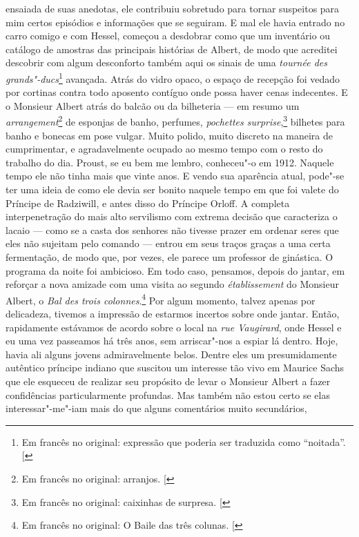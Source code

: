 ensaiada de suas anedotas, ele contribuiu sobretudo para tornar
suspeitos para mim certos episódios e informações que se seguiram. E mal
ele havia entrado no carro comigo e com Hessel, começou a desdobrar como
que um inventário ou catálogo de amostras das principais histórias de
Albert, de modo que acreditei descobrir com algum desconforto também
aqui os sinais de uma \emph{tournée des grands"-ducs}\footnote{Em francês no original: expressão que poderia ser traduzida como ``noitada''. {[}\versal{N.~T.}{]}} avançada. Atrás do
vidro opaco, o espaço de recepção foi vedado por cortinas contra todo
aposento contíguo onde possa haver cenas indecentes. E o Monsieur Albert
atrás do balcão ou da bilheteria --- em resumo um \emph{arrangement}\footnote{Em francês no original: arranjos. {[}\versal{N.~T.}{]}} de
esponjas de banho, perfumes, \emph{pochettes surprise},\footnote{Em francês no original: caixinhas de surpresa. {[}\versal{N.~T.}{]}} bilhetes para
banho e bonecas em pose vulgar. Muito polido, muito discreto na maneira
de cumprimentar, e agradavelmente ocupado ao mesmo tempo com o resto do
trabalho do dia. Proust, se eu bem me lembro, conheceu"-o em 1912.
Naquele tempo ele não tinha mais que vinte anos. E vendo sua aparência
atual, pode"-se ter uma ideia de como ele devia ser bonito naquele tempo
em que foi valete do Príncipe de Radziwill, e antes disso do Príncipe
Orloff. A completa interpenetração do mais alto servilismo com extrema
decisão que caracteriza o lacaio --- como se a casta dos senhores não
tivesse prazer em ordenar seres que eles não sujeitam pelo comando ---
entrou em seus traços graças a uma certa fermentação, de modo que, por
vezes, ele parece um professor de ginástica. O programa da noite foi
ambicioso. Em todo caso, pensamos, depois do jantar, em reforçar a nova
amizade com uma visita ao segundo \emph{établissement} do Monsieur
Albert, o \emph{Bal des trois colonnes}.\footnote{Em francês no original: O Baile das três colunas. {[}\versal{N.~T.}{]}} Por algum momento, talvez
apenas por delicadeza, tivemos a impressão de estarmos incertos sobre
onde jantar. Então, rapidamente estávamos de acordo sobre o local na
\emph{rue Vaugirard}, onde Hessel e eu uma vez passeamos há três anos,
sem arriscar"-nos a espiar lá dentro. Hoje, havia ali alguns jovens
admiravelmente belos. Dentre eles um presumidamente autêntico príncipe
indiano que suscitou um interesse tão vivo em Maurice Sachs que ele
esqueceu de realizar seu propósito de levar o Monsieur Albert a fazer
confidências particularmente profundas. Mas também não estou certo se
elas interessar"-me"-iam mais do que alguns comentários muito secundários,
